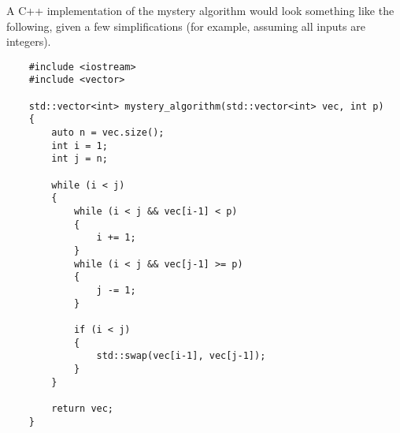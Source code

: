 \documentclass[14pt]{extreport}
\begin{document}
A C++ implementation of the mystery algorithm would look something like the following, given a few simplifications (for example, assuming all inputs are integers). 

\begin{verbatim}
    #include <iostream>
    #include <vector>

    std::vector<int> mystery_algorithm(std::vector<int> vec, int p)
    {
        auto n = vec.size();
        int i = 1;
        int j = n;

        while (i < j)
        {
            while (i < j && vec[i-1] < p)
            {
                i += 1;
            }
            while (i < j && vec[j-1] >= p)
            {
                j -= 1;
            }
            
            if (i < j)
            {
                std::swap(vec[i-1], vec[j-1]);
            }
        }
        
        return vec;
    }
\end{verbatim}
\end{document}
